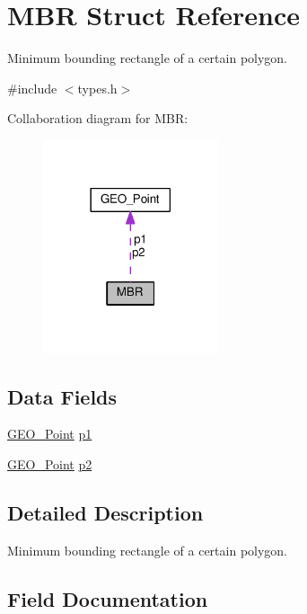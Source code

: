 \hypertarget{struct_m_b_r}{}\section{M\+BR Struct Reference}
\label{struct_m_b_r}


Minimum bounding rectangle of a certain polygon.  




{\ttfamily \#include $<$types.\+h$>$}



Collaboration diagram for M\+BR\+:
\nopagebreak
\begin{figure}[H]
\begin{center}
\leavevmode
\includegraphics[width=146pt]{struct_m_b_r__coll__graph}
\end{center}
\end{figure}
\subsection*{Data Fields}
\begin{DoxyCompactItemize}
\item 
\hyperlink{struct_g_e_o___point}{G\+E\+O\+\_\+\+Point} \hyperlink{struct_m_b_r_aece77b6cba572ad1536ef0f6ce20cb82}{p1}
\item 
\hyperlink{struct_g_e_o___point}{G\+E\+O\+\_\+\+Point} \hyperlink{struct_m_b_r_a51a95439187066c7cc5f32a60cdef5a6}{p2}
\end{DoxyCompactItemize}


\subsection{Detailed Description}
Minimum bounding rectangle of a certain polygon. 

\subsection{Field Documentation}
